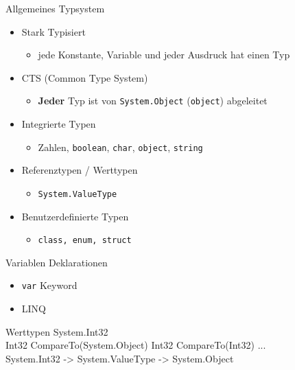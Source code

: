 \documentclass[11pt]{beamer}
\begin{document}
\begin{frame}{Allgemeines Typsystem}
\begin{itemize}
	\item Stark Typisiert
	\begin{itemize}
		\item jede Konstante, Variable und jeder Ausdruck hat einen Typ
	\end{itemize}
	\item CTS (Common Type System)
	\begin{itemize}
		\item \textbf{Jeder} Typ ist von \texttt{System.Object} (\texttt{object}) abgeleitet
	\end{itemize}

	\item Integrierte Typen
	\begin{itemize}
		\item \glqq Zahlen\grqq{}, \texttt{boolean}, \texttt{char}, \texttt{object}, \texttt{string}
	\end{itemize}
	\item Referenztypen / Werttypen
	\begin{itemize}
		\item \texttt{System.ValueType}
	\end{itemize}
	\item Benutzerdefinierte Typen
	\begin{itemize}
		\item \texttt{class, enum, struct}
	\end{itemize}
\end{itemize}
\end{frame}


\begin{frame}{Variablen Deklarationen}

%
\begin{itemize}
	\item \texttt{var} Keyword \cite{so_var_java}
	\item LINQ
\end{itemize}
\end{frame}


\begin{frame}{Werttypen}
System.Int32 \\ %
Int32 CompareTo(System.Object) Int32 CompareTo(Int32) ... \\
System.Int32 -> System.ValueType -> System.Object
\end{frame}
\end{document}
